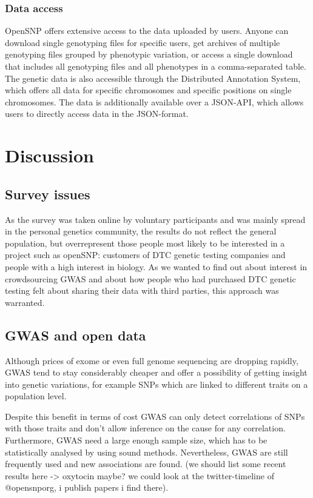 \documentclass[10pt]{article}
\begin{document}
\subsubsection*{Data access}
OpenSNP offers extensive access to the data uploaded by users. Anyone can download single genotyping files for specific users, get archives of multiple genotyping files 
grouped by phenotypic variation, or access a single download that includes all genotyping files and all phenotypes in a comma-separated table. The genetic data is also 
accessible through the Distributed Annotation System, which offers all data for specific chromosomes and specific positions on single chromosomes. 
The data is additionally available over a JSON-API, which allows users to directly access data in the JSON-format.


\section*{Discussion}

\subsection*{Survey issues}
As the survey was taken online by voluntary participants and was mainly spread in the personal genetics community, 
the results do not reflect the general population, but overrepresent those people most likely to be interested in
a project such as openSNP: customers of DTC genetic testing companies and people with a high interest in biology. 
As we wanted to find out about interest in crowdsourcing GWAS and about how people who had purchased DTC genetic 
testing felt about sharing their data with third parties, this approach was warranted.

\subsection*{GWAS and open data}
Although prices of exome or even full genome sequencing are dropping rapidly, GWAS tend to stay considerably cheaper 
and offer a possibility of getting insight into genetic variations, for example SNPs which are linked to different traits 
on a population level. 

Despite this benefit in terms of cost GWAS can only detect correlations of SNPs with those traits and don't allow 
inference on the cause for any correlation. Furthermore, GWAS need a large enough sample size, 
which has to be statistically analysed by using sound methods. 
Nevertheless, GWAS are still frequently used and new associations are found. 
(we should list some recent results here -> oxytocin maybe? we could look at the twitter-timeline of @opensnporg, i publish papers i find there).
\end{document}
